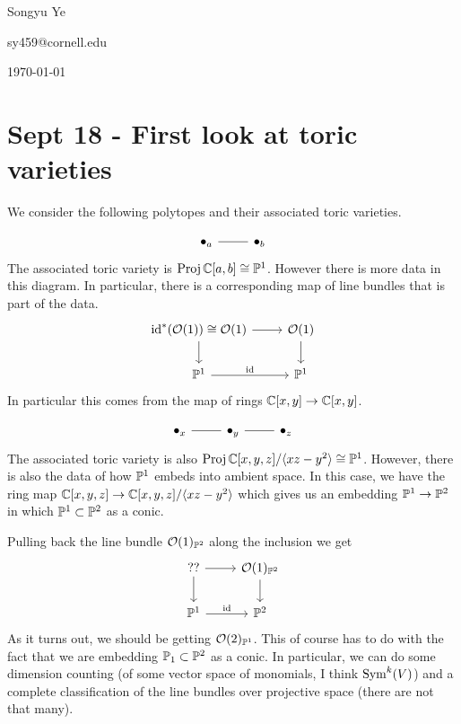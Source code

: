 \documentclass[12pt]{article}
\begin{document}
Songyu Ye 

sy459@cornell.edu

\today
\section{Sept 18 - First look at toric varieties}

We consider the following polytopes and their associated toric varieties.
\begin{example}
    \[\begin{tikzcd}
	\bullet_a & \bullet_b
	\arrow[no head, from=1-1, to=1-2]
\end{tikzcd}\]
The associated toric variety is $\Proj \C[a,b] \cong \P^1$. However there is more data in this diagram. In particular, there is a corresponding map of line bundles that is part of the data.
\[\begin{tikzcd}
	{\text{id}^*(\mathcal O(1)) \cong \mathcal O(1)} & {\mathcal O(1)} \\
	{\mathbb{P}^1} & {\mathbb{P}^1}
	\arrow[from=1-2, to=2-2]
	\arrow["{\text{id}}", from=2-1, to=2-2]
	\arrow[from=1-1, to=1-2]
	\arrow[from=1-1, to=2-1]
\end{tikzcd}\] In particular this comes from the map of rings $\C[x,y]\to\C[x,y]$.
\end{example}

\begin{example}
    \[\begin{tikzcd}
	\bullet_x & \bullet_y & \bullet_z
	\arrow[no head, from=1-1, to=1-2]
	\arrow[no head, from=1-2, to=1-3]
\end{tikzcd}\]
The associated toric variety is also $\Proj \C[x,y,z]/\langle xz - y^2\rangle \cong \P^1$. However, there is also the data of how $\P^1$ embeds into ambient space. In this case, we have the ring map $\C[x,y,z]\to\C[x,y,z]/\langle xz - y^2\rangle$ which gives us an embedding $\P^1\to\P^2$ in which $\P^1\subset \P^2$ as a conic.

\hfill

Pulling back the line bundle $\mc O(1)_{\P^2}$ along the inclusion we get 
\[\begin{tikzcd}
	{??} & {\mathcal O(1)_{\mathbb{P}^2}} \\
	{\mathbb{P}^1} & {\mathbb{P}^2}
	\arrow[from=1-2, to=2-2]
	\arrow["{\text{id}}", from=2-1, to=2-2]
	\arrow[from=1-1, to=1-2]
	\arrow[from=1-1, to=2-1]
\end{tikzcd}\] As it turns out, we should be getting $\mc O(2)_{\P^1}$. This of course has to do with the fact that we are embedding $\P_1\subset \P^2$ as a conic. In particular, we can do some dimension counting (of some vector space of monomials, I think $\Sym^k(V)$) and a complete classification of the line bundles over projective space (there are not that many).
\end{example}
\end{document}
